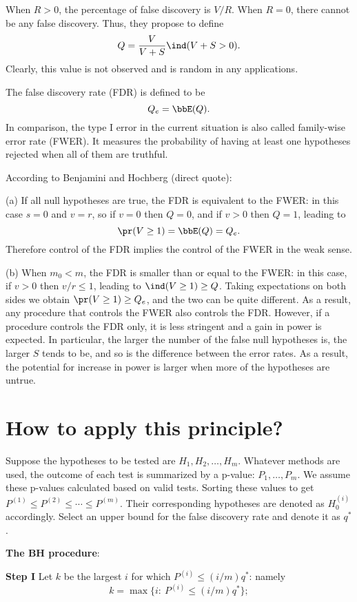When $R > 0$, the percentage of false discovery is $V/R$.
When $R = 0$, there cannot be any false discovery.
Thus, they propose to define
\[
Q = \frac{V}{V+S} \ind(V+S > 0).
\]
Clearly, this value is not observed and
is random in any applications.

The false discovery rate (FDR) is defined to be
\[
Q_e = \bbE(Q).
\]
In comparison, the type I error in the current situation is also called
family-wise error rate (FWER). It measures the probability of
having at least one hypotheses rejected when all of them
are truthful.

According to Benjamini and Hochberg (direct quote):

(a) If all null hypotheses are true, the FDR is equivalent to the FWER: 
in this case $s=0$ and $v=r$, so if $v=0$
then $Q=0$, and if $v>0$ then $Q=1$, 
leading to 
\[
\pr(V \geq 1) = \bbE(Q) = Q_e.
\]
Therefore control of the FDR implies the control of the FWER in the weak sense. 

(b) When $m_0 < m$, the FDR is smaller than or equal to the FWER:
 in this case, if $v>0$ then $v/r \leq 1$, leading to $\ind (V \geq 1) \geq Q$.
 Taking expectations on both sides we obtain 
 $\pr(V \geq 1) \geq Q_e$, and the two can be quite different. 
 As a result, any procedure that controls the FWER also controls the FDR. 
 However, if a procedure controls the FDR only, 
 it is less stringent and a gain in power is expected. 
 In particular, the larger the number of the false null hypotheses is, 
 the larger $S$ tends to be, and so is the difference between the error rates. 
 As a result, the potential for increase in power is larger 
 when more of the hypotheses are untrue.

\section{How to apply this principle?}

Suppose the hypotheses to be tested are $H_1, H_2, \ldots, H_m$.
Whatever methods are used, the outcome of each test is summarized
by a p-value: $P_1, \ldots, P_m$. We assume these p-values calculated
based on valid tests.
Sorting these values to get $P^{(1)} \leq P^{(2)} \leq \cdots \leq P^{(m)}$.
Their corresponding hypotheses are denoted as $H_0^{(i)}$ accordingly.
Select an upper bound for the false discovery rate and denote it as $q^*$.

\vs \noindent
{\bf The BH procedure}:

\vs\vs \noindent
{\bf Step I}
Let $k$ be the largest $i$ for which $P^{(i)} \leq (i/m) q^*$: namely
\[
k = \max \{ i:  ~P^{(i)} \leq (i/m) q^* \};
\]

